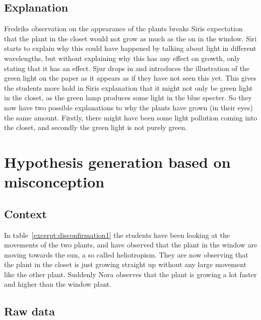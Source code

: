\subsection{Explanation}
Fredriks observation on the appearance of the plants breaks Siris expectation that the plant in the closet would not grow as much as the on in the window. Siri starts to explain why this could have happened by talking about light in different wavelengths, but without explaining why this has any effect on growth, only stating that it has an effect.
Sjur drops in and introduces the illustration of the green light on the paper as it appears as if they have not seen this yet. This gives the students more hold in Siris explanation that it might not only be green light in the closet, as the green lamp produces some light in the blue specter. So they now have two possible explanations to why the plants have grown (in their eyes) the same amount. Firstly, there might have been some light pollution coming into the closet, and secondly the green light is not purely green.

\section{Hypothesis generation based on misconception}

\subsection{Context}
In table~\ref{excerpt:disconfirmation1} the students have been looking at the movements of the two plants, and have observed that the plant in the window are moving towards the sun, a so called heliotropism. They are now observing that the plant in the closet is just growing straight up without any large movement like the other plant. Suddenly Nora observes that the plant is growing a lot faster and higher than the window plant.
\subsection{Raw data}


